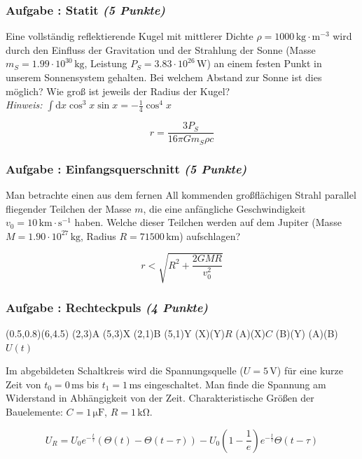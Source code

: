 \documentclass[12pt,a4paper]{article}
\newcommand{\ee}[1]{\cdot 10^{#1}}
\newcommand{\unit}[1]{\,\mathrm{#1}}
\newcommand{\dif}{\mathrm{d}}
\newcommand{\hinweis}{\emph{Hinweis:} }
\newcommand{\skizze}[1]{
\begin{center}
#1
\end{center}
}
\newcounter{numlabel}
\newenvironment{problem}[2]{\stepcounter{numlabel} \vspace{1ex} \subsubsection*{Aufgabe \the\value{numlabel}: #1 \emph{(#2 Punkte)}} \renewcommand{\Currentlabel}{Aufgabe \the\value{numlabel}: #1}}{

}
\begin{document}
\begin{problem}{Statit}{5}
Eine vollständig reflektierende Kugel mit mittlerer Dichte $\rho=1000 \unit{kg\cdot m^{-3}}$ wird durch den Einfluss der Gravitation und der Strahlung der Sonne (Masse $m_S=1.99 \ee{30} \unit{kg}$, Leistung $P_S=3.83 \ee{26} \unit{W}$) an einem festen Punkt in unserem Sonnensystem gehalten. Bei welchem Abstand zur Sonne ist dies möglich? Wie groß ist jeweils der Radius der Kugel?\\
\hinweis $\int \dif x \cos^3 x \sin x=-\frac 14 \cos^4 x$ 

\begin{solution}
\[
r=\frac{3 P_S}{16 \pi G m_S \rho c}
\]
\end{solution}
\end{problem}

\begin{problem}{Einfangsquerschnitt}{5}
Man betrachte einen aus dem fernen All kommenden großflächigen Strahl parallel fliegender Teilchen der Masse $m$, die eine anfängliche Geschwindigkeit $v_0=10 \unit{km \cdot s^{-1}}$ haben. Welche dieser Teilchen werden auf dem Jupiter (Masse $M=1.90 \ee{27} \unit{kg}$, Radius $R=71500 \unit{km}$) aufschlagen?

\begin{solution}
\[
r<\sqrt{R^2+\frac{2 GMR}{v_0^2}}
\]
\end{solution}
\end{problem}

\begin{problem}{Rechteckpuls}{4}
\skizze{
\begin{pspicture}(0.5,0.8)(6,4.5)
 \pnode(2,3){A}
 \pnode(5,3){X}
 \pnode(2,1){B}
 \pnode(5,1){Y}
 \resistor(X)(Y){$R$}
 \capacitor[labeloffset=1](A)(X){$C$}
 \wire(B)(Y)
 \tension(A)(B){$U(t)$}
\end{pspicture}
}
Im abgebildeten Schaltkreis wird die Spannungsquelle ($U=5 \unit{V}$) für eine kurze Zeit von $t_0 = 0 \unit{ms}$ bis $t_1 = 1 \unit{ms}$ eingeschaltet. Man finde die Spannung am Widerstand in Abhängigkeit von der Zeit. Charakteristische Größen der Bauelemente: $C=1 \unit{\mu F}$, $R=1 \unit{k\Omega}$.

\begin{solution}
\[
U_R=U_0 e^{-\frac t \tau} (\Theta(t)-\Theta(t-\tau))-U_0 (1-\frac 1e) e^{-\frac t \tau} \Theta(t-\tau)
\]
\end{solution}
\end{problem}
\end{document}
